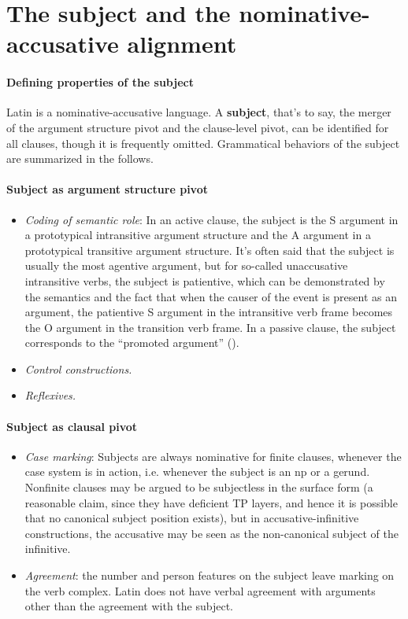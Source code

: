 \documentclass[a4paper, oneside, 12pt]{report}
\newcommand*{\concept}[1]{\textbf{#1}}
\begin{document}
\section{The subject and the nominative-accusative alignment}

\paragraph*{Defining properties of the subject} Latin is a nominative-accusative language.
A \concept{subject}, that's to say, the merger of 
the argument structure pivot and the clause-level pivot, 
can be identified for all clauses, 
though it is frequently omitted.
Grammatical behaviors of the subject are summarized in the follows.

\paragraph*{Subject as argument structure pivot}
\begin{itemize}
    \item \emph{Coding of semantic role}: In an active clause, 
    the subject 
    is the S argument in a prototypical intransitive argument structure 
    and the A argument in a prototypical transitive argument structure.
    It's often said that the subject is usually the most agentive argument,
    but for so-called unaccusative intransitive verbs, 
    the subject is patientive,
    which can be demonstrated by the semantics 
    and the fact that when the causer of the event is present as an argument, 
    the patientive S argument in the intransitive verb frame
    becomes the O argument in the transition verb frame.
    In a passive clause, 
    the subject corresponds to the ``promoted argument'' ().  
    \item \emph{Control constructions.} 
    \item \emph{Reflexives.}
\end{itemize}

\paragraph*{Subject as clausal pivot}

\begin{itemize}
    \item \emph{Case marking}: 
    Subjects are always nominative for finite clauses,
    whenever the case system is in action,
    i.e. whenever the subject is an \ac{np} or a gerund. 
    Nonfinite clauses may be argued to be subjectless in the surface form 
    (a reasonable claim, since they have deficient TP layers, 
    and hence it is possible that no canonical subject position exists),
    but in accusative-infinitive constructions, %
    the accusative may be seen as the non-canonical subject of the infinitive.
    \item \emph{Agreement}: 
    the number and person features on the subject leave marking on the verb complex.
    Latin does not have verbal agreement with arguments other than the agreement with the subject.
\end{itemize}
\end{document}

